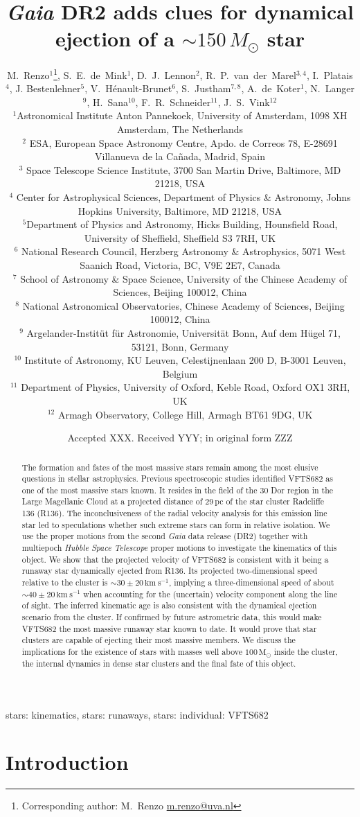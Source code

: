 \documentclass[a4paper,fleqn,usenatbib]{mnras}
\title[\emph{Gaia} DR2 adds clues for dynamical ejections of a $\sim$$150\,M_\odot$ star]{\emph{Gaia} DR2 adds clues for dynamical ejection of a $\sim$$150\,M_\odot$ star}
\author[Renzo et al.]{
M.~Renzo$^{1}$\thanks{Corresponding author: M.~Renzo
  \href{mailto:m.renzo@uva.nl}{m.renzo@uva.nl}},
S.~E.~de~Mink$^{1}$,
D.~J.~Lennon$^{2}$,
R.~P.~van~der~Marel$^{3,4}$,
I.~Platais$^{4}$,
J. Bestenlehner$^{5}$,
V.~H\'enault-Brunet$^{6}$,
S.~Justham$^{7,8}$,
A.~de~Koter$^{1}$,
N.~Langer$^{9}$,
H.~Sana$^{10}$,
F.~R.~Schneider$^{11}$,
J.~S.~Vink$^{12}$ \\
$^{1}${Astronomical Institute Anton Pannekoek, University of
  Amsterdam, 1098 XH Amsterdam, The Netherlands} \\
$^{2}$ {ESA, European Space Astronomy Centre, Apdo. de Correos 78,
  E-28691 Villanueva de la Ca\~nada, Madrid, Spain} \\
$^{3}$ {Space Telescope Science Institute, 3700 San Martin Drive,
  Baltimore, MD 21218, USA}\\
$^{4}$ {Center for Astrophysical Sciences, Department of Physics \& Astronomy, Johns Hopkins University, Baltimore, MD 21218, USA}\\
$^{5}${Department of Physics and Astronomy, Hicks Building,
  Hounsfield Road, University of Sheffield, Sheffield S3 7RH, UK}\\
$^{6}$ {National Research Council, Herzberg Astronomy \&
  Astrophysics, 5071 West Saanich Road, Victoria, BC, V9E 2E7,
  Canada}\\
$^{7}$ {School of Astronomy \& Space Science, University of the Chinese
  Academy of Sciences, Beijing 100012, China}\\
$^{8}$ {National Astronomical Observatories, Chinese Academy of
  Sciences, Beijing 100012, China}\\
$^{9}$ {Argelander-Instit\"ut f\"ur Astronomie, Universit\"at Bonn,
  Auf dem H\"ugel 71, 53121, Bonn, Germany}\\
$^{10}$ {Institute of Astronomy, KU Leuven, Celestijnenlaan 200 D, B-3001 Leuven, Belgium}\\
$^{11}$ {Department of Physics, University of Oxford, Keble Road,
  Oxford OX1 3RH, UK} \\
$^{12}$ {Armagh Observatory, College Hill, Armagh BT61 9DG, UK}
}
\date{Accepted XXX. Received YYY; in original form ZZZ}
\newcommand{\kms}{{\,\mathrm{km\ s^{-1}}}}
\newcommand{\Msun}{{\,\mathrm{M}_\odot}}
\begin{document}
\label{firstpage}
\pagerange{\pageref{firstpage}--\pageref{lastpage}}
\maketitle

\begin{abstract}

  The formation and fates of the most massive stars remain among the most elusive questions in stellar astrophysics. 
  Previous spectroscopic studies identified VFTS682 as one of the most
  massive stars known. It resides in the field of the 30 Dor region in
  the Large Magellanic Cloud at a projected distance of 29\,pc of the
  star cluster Radcliffe 136 (R136). The inconclusiveness of the radial
  velocity analysis for this emission line star led to speculations whether such extreme
  stars can form in relative isolation. 
  We use the proper motions from the second \emph{Gaia} data
  release (DR2) together with multiepoch \emph{Hubble Space Telescope} proper motions to investigate the kinematics of this object. We show
  that the projected velocity of VFTS682 is consistent with it being a
  runaway star dynamically ejected from R136. Its
  projected two-dimensional speed relative to the cluster is $\sim$$30\pm20\kms$, implying a three-dimensional speed of about $\sim$$40\pm20\kms$ when
  accounting for the (uncertain) velocity component along the line of sight. The
  inferred kinematic age is also  consistent with the dynamical ejection scenario from the cluster. 
  If confirmed by future astrometric data, this would make VFTS682
  the most massive runaway star known to date. It would prove that star clusters are capable of ejecting their most massive members. We discuss the implications for the existence of stars with masses well above $100\Msun$ inside the cluster, the internal dynamics in dense star clusters and the final fate of this object. 
\end{abstract}

\begin{keywords}
  stars: kinematics, stars: runaways, stars: individual: VFTS682
\end{keywords}



\section{Introduction}
\label{sec:intro}
\end{document}
